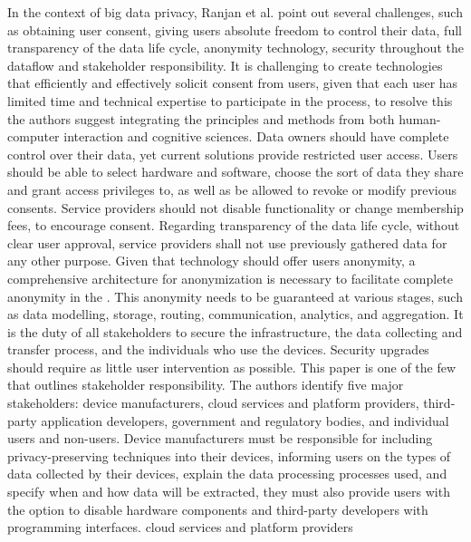 In the context of big data privacy, Ranjan et al. \cite{perera2015big} point
out several challenges, such as obtaining user consent, giving users absolute
freedom to control their data, full transparency of the data life cycle, anonymity
technology, security throughout the dataflow and stakeholder responsibility.
It is challenging to create technologies that efficiently and effectively solicit
consent from users, given that each user has limited time and technical expertise
to participate in the process, to resolve this the authors suggest
integrating the principles and methods from both human-computer interaction and
cognitive sciences. Data owners should have complete control over their data,
yet current solutions provide restricted user access. Users should be able to
select hardware and software, choose the sort of data they share and grant access
privileges to, as well as be allowed to revoke or modify previous consents.
Service providers should not disable functionality or change membership fees,
to encourage consent. Regarding transparency of the data life cycle, without
clear user approval, service providers shall not use previously gathered data
for any other purpose. Given that technology should offer users anonymity, a
comprehensive architecture for anonymization is necessary to facilitate complete
anonymity in the \hyperlink{\acronym}{\acronym}. This anonymity needs to be guaranteed at various stages,
such as data modelling, storage, routing, communication, analytics, and aggregation.
It is the duty of all stakeholders to secure the infrastructure, the data collecting
and transfer process, and the individuals who use the devices. Security upgrades
should require as little user intervention as possible.
This paper is one of the few that outlines stakeholder responsibility. The
authors identify five major stakeholders: device manufacturers, \hyperlink{\acronym}{\acronym} cloud services
and platform providers, third-party application developers, government and regulatory
bodies, and individual users and non-users. Device manufacturers must be responsible
for including privacy-preserving techniques into their devices, informing users
on the types of data collected by their devices, explain the data processing
processes used, and specify when and how data will be extracted, they must also
provide users with the option to disable hardware components and third-party
developers with programming interfaces. \hyperlink{\acronym}{\acronym} cloud services and platform providers
